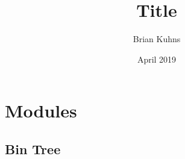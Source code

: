 \documentclass{article}
\title{Title}
\author{ Brian Kuhns }
\date{April 2019}
\begin{document}
\maketitle

\section{Modules}

\subsection{Bin Tree}


\end{document}

